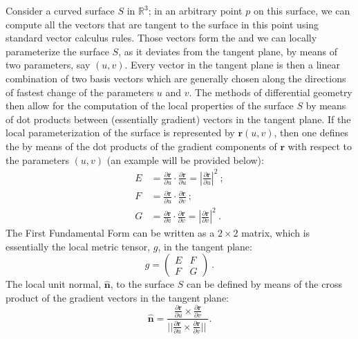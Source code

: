 Consider a curved surface $S$ in $\mathbb{R}^3$; in an arbitrary point $p$ on this surface, we can compute all the vectors that are tangent to the surface in this point using standard vector calculus rules.  Those vectors form the  and we can locally parameterize the surface $S$, as it deviates from the tangent plane, by means of two parameters, say $(u,v)$.  Every vector in the tangent plane is then a linear combination of two basis vectors which are generally chosen along the directions of fastest change of the parameters $u$ and $v$.  The methods of differential geometry then allow for the computation of the local properties of the surface $S$ by means of dot products between (essentially gradient) vectors in the tangent plane. If the local parameterization of the surface is represented by $\mathbf{r}(u,v)$, then one defines the  by means of the dot products of the gradient components of $\mathbf{r}$ with respect to the parameters $(u,v)$ (an example will be provided below):
\begin{equation}
\begin{split}
	E &= \frac{\partial \mathbf{r}}{\partial u}\cdot\frac{\partial \mathbf{r}}{\partial u} = \left\vert \frac{\partial \mathbf{r}}{\partial u}\right\vert^2\ ;\\
	F &= \frac{\partial \mathbf{r}}{\partial u}\cdot\frac{\partial \mathbf{r}}{\partial v}\ ;\\
	G &= \frac{\partial \mathbf{r}}{\partial v}\cdot\frac{\partial \mathbf{r}}{\partial v}=\left\vert \frac{\partial \mathbf{r}}{\partial v}\right\vert^2\ .
\end{split}
\label{\chabbr:eq:firstFF}
\end{equation}
The First Fundamental Form can be written as a $2\times 2$ matrix, which is essentially the local metric tensor, $g$, in the tangent plane:
\begin{equation}
	g = \begin{pmatrix} E & F\\ F & G\end{pmatrix}\ .
\end{equation}
The local unit normal, $\hat{\mathbf{n}}$, to the surface $S$ can be defined by means of the cross product of the gradient vectors in the tangent plane:
\begin{equation}
	\hat{\mathbf{n}} = \frac{ \frac{\partial \mathbf{r}}{\partial u} \times \frac{\partial \mathbf{r}}{\partial v} }{\vert\vert \frac{\partial \mathbf{r}}{\partial u} \times \frac{\partial \mathbf{r}}{\partial v} \vert\vert\ } .
\end{equation}
